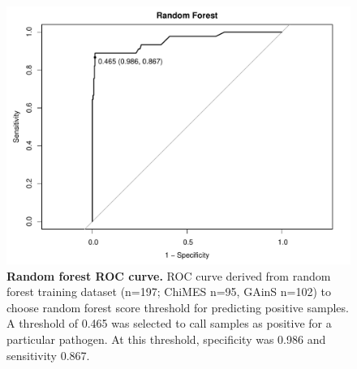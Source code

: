 \FloatBarrier
\begin{figure}[htbp]
\centering
\includegraphics[scale=0.6]{./Results2/Images/rf-roc.pdf}
\caption[Random forest ROC curve]{\textbf{Random forest ROC curve.} ROC curve derived from random forest training dataset (n=197; ChiMES n=95, GAinS n=102) to choose random forest score threshold for predicting positive samples. A threshold of 0.465 was selected to call samples as positive for a particular pathogen. At this threshold, specificity was 0.986 and sensitivity 0.867.}
\label{fig:rf-roc}
\end{figure}

